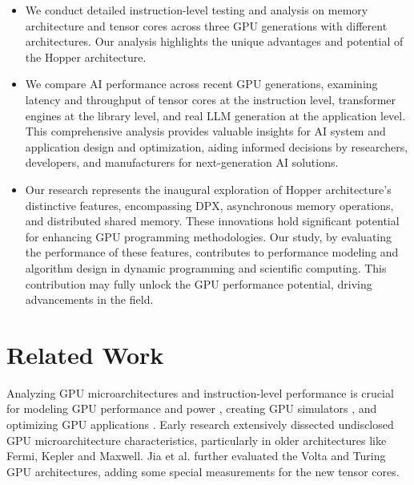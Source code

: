 \begin{itemize}
    \item We conduct detailed instruction-level testing and analysis on memory architecture and tensor cores across three GPU generations with different architectures. Our analysis highlights the unique advantages and potential of the Hopper architecture.
    \item We compare AI performance across recent GPU generations, examining latency and throughput of tensor cores at the instruction level, transformer engines at the library level, and real LLM generation at the application level. This comprehensive analysis provides valuable insights for AI system and application design and optimization, aiding informed decisions by researchers, developers, and manufacturers for next-generation AI solutions.
    \item Our research represents the inaugural exploration of Hopper architecture's distinctive features, encompassing DPX, asynchronous memory operations, and distributed shared memory. These innovations hold significant potential for enhancing GPU programming methodologies. Our study, by evaluating the performance of these features, contributes to performance modeling and algorithm design in dynamic programming and scientific computing. This contribution may fully unlock the GPU performance potential, driving advancements in the field.
\end{itemize}

\section{Related Work} Analyzing GPU microarchitectures and instruction-level performance is crucial for modeling GPU performance and power \cite{isca2010_hong,taco2021_portable,hpca2019_hybrid,tpds2020_gpudvfs,mei2017survey,arafa2020verified,van2022isolating,arafa2019low}, creating GPU simulators \cite{accelsim_isca2020,bakhoda2009analyzing,gpuwattch_isca2013}, and optimizing GPU applications \cite{bakhoda2009analyzing,ho2017exploiting,yan_optimize_ppopp2020}. Early research \cite{wong2010demystifying,mei2014benchmarking,mei_tpds_2017,jia2018dissecting,jia2019dissecting} extensively dissected undisclosed GPU microarchitecture characteristics, particularly in older architectures like Fermi, Kepler and Maxwell. Jia et al. \cite{jia2018dissecting,jia2019dissecting} further evaluated the Volta and Turing GPU architectures, adding some special measurements for the new tensor cores. 

